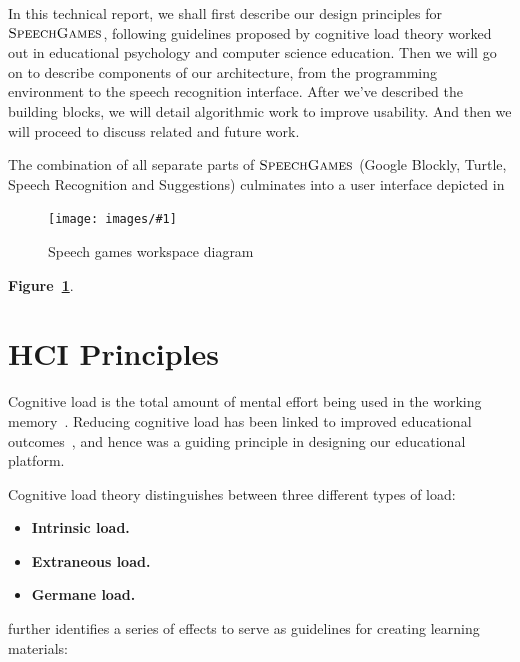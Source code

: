 \documentclass[]{article}
\newcommand\fig[3]{
\begin{figure}
  \begin{center}
  \texttt{[image: images/\#1]}
  \caption{#2} 
  \label{fig:#1}
  \end{center}
\end{figure}
}
\def\sg{\textsc{SpeechGames}}
\begin{document}

In this technical report, we shall first describe our design principles for
$\sg$, following guidelines proposed by cognitive load theory worked out in
educational psychology and computer science education. Then we will go on to
describe components of our architecture, from the programming environment to the
speech recognition interface. After we've described the building blocks, we will
detail algorithmic work to improve usability. And then we will proceed to
discuss related and future work.

The combination of all separate parts of $\sg$ (Google Blockly, Turtle, 
Speech Recognition and Suggestions) culminates into a user interface depicted in
\fig{ResearchOverview.jpg}{Speech games workspace diagram}{width=10cm}
\textbf{Figure~\ref{fig:ResearchOverview.jpg}}.

\section{HCI Principles}
Cognitive load is the total amount of mental effort being used in the working
memory~\cite{sweller1988cognitive}. Reducing cognitive load has been linked to
improved educational outcomes~\cite{kalyuga2010facilitating}, and hence was a
guiding principle in designing our educational platform.

Cognitive load theory distinguishes between three different types of load:

\begin{itemize}
  \item \textbf{Intrinsic load.}
  \item \textbf{Extraneous load.}
  \item \textbf{Germane load.}
\end{itemize}

\cite{rebetez2006control} further identifies a series of effects to serve as
guidelines for creating learning materials:
\end{document}

